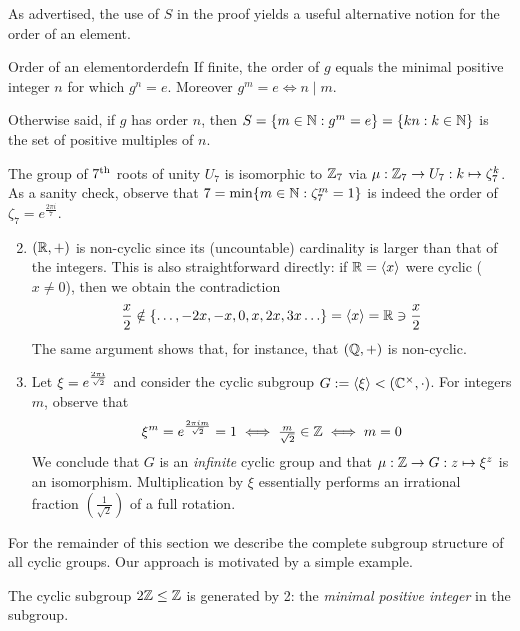 As advertised, the use of $S$ in the proof yields a useful alternative notion for the order of an element.

\begin{cor}{Order of an element}{orderdefn}
	If finite, the order of $g$ equals the minimal positive integer $n$ for which $g^n=e$. Moreover $g^m=e\Longleftrightarrow n\mid m$.
\end{cor}

Otherwise said, if $g$ has order $n$, then $S=\{m\in\mathbb{N}:g^m=e\}=\{kn:k\in\mathbb{N}\}$ is the set of positive multiples of $n$.



\begin{examples}{}{}
	\exstart The group of $7\textsuperscript{th}$ roots of unity $U_7$ is isomorphic to $\mathbb{Z}_7$ via $\mu:\mathbb{Z}_7\to U_7:k\mapsto \zeta_7^k$. As a sanity check, observe that $7=\min\{m\in\mathbb{N}:\zeta_7^m=1\}$ is indeed the order of $\zeta_7 =e^{\frac{2\pi i}7}$.
	\begin{enumerate}\setcounter{enumi}{1}
		\item $(\mathbb{R},+)$ is non-cyclic since its (uncountable) cardinality is larger than that of the integers. This is also straightforward directly: if $\mathbb{R}=\left\langle x\right\rangle$ were cyclic ($x\neq 0$), then we obtain the contradiction
		\[
			\frac x2\notin\{\ldots,-2x,-x,0,x,2x,3x\ldots\}=\left\langle x\right\rangle=\mathbb{R}\ni\frac x2
		\]
		The same argument shows that, for instance, that $(\mathbb{Q},+)$ is non-cyclic.
		
		\item Let $\xi=\smash[t]{e^{\frac{2\pi i}{\sqrt 2}}}$ and consider the cyclic subgroup $G:=\left\langle \xi\right\rangle<(\mathbb{C}^\times,\cdot)$. For integers $m$, observe that
		\[
			\xi^m=e^{\frac{2\pi im}{\sqrt 2}}=1\iff \tfrac m{\sqrt 2}\in\mathbb{Z}\iff m=0
		\]
		We conclude that $G$ is an \emph{infinite} cyclic group and that $\mu:\mathbb{Z}\to G:z\mapsto\xi^z$ is an isomorphism. Multiplication by $\xi$ essentially performs an irrational fraction $(\frac 1{\sqrt 2})$ of a full rotation.
	\end{enumerate}
\end{examples}


\goodbreak



For the remainder of this section we describe the complete subgroup structure of all cyclic groups. Our approach is motivated by a simple example.

\begin{example}{}{}
	The cyclic subgroup $2\mathbb{Z}\le\mathbb{Z}$ is generated by 2: the \emph{minimal positive integer} in the subgroup.
\end{example}

